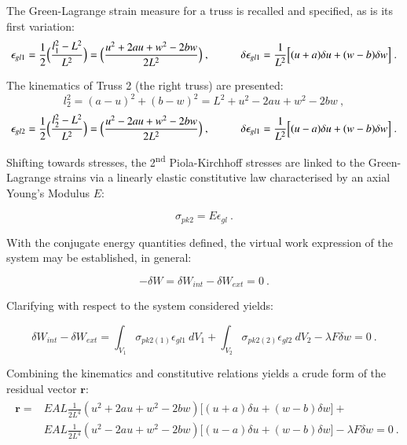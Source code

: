 The Green-Lagrange strain measure for a truss is recalled and specified, as is its first variation:
\begin{equation} 
\epsilon_{gl1} = \frac{1}{2}
\Big(\frac{l_1^2-L^2}{L^2}\Big)
=
\Big(\frac{u^2 + 2au +w^2 -2bw}{2L^2}\Big)\ ,
\hspace{10mm}
\delta\epsilon_{gl1} = 
\frac{1}{L^2}
\Big[
(u+a)\delta u
+
(w-b)\delta w
\Big]
\label{eqapp0_2}\ .
\end{equation}

The kinematics of Truss 2 (the right truss) are presented:
\begin{equation} 
l_2^2 = (a-u)^2 + (b-w)^2 = L^2 + u^2 - 2au +w^2 -2bw
\label{eqapp0_2_1}\ ,
\end{equation}
\begin{equation} 
\epsilon_{gl2} = \frac{1}{2}
\Big(\frac{l_2^2-L^2}{L^2}\Big)
=
\Big(\frac{u^2 - 2au +w^2 -2bw}{2L^2}\Big)\ ,
\hspace{10mm}
\delta\epsilon_{gl1} = 
\frac{1}{L^2}
\Big[
(u-a)\delta u
+
(w-b)\delta w
\Big]
\label{eqapp0_2_2}\ .
\end{equation}

Shifting towards stresses, the 2\textsuperscript{nd} Piola-Kirchhoff stresses are linked to the Green-Lagrange strains via a linearly elastic constitutive law characterised by an axial Young's Modulus $E$:

\begin{equation} 
\sigma_{pk2} = E \epsilon_{gl}
\label{eqapp0_3}\ .
\end{equation}

With the conjugate energy quantities defined, the virtual work expression of the system may be established, in general:

\begin{equation} 
-\delta W = \delta W_{int} - \delta W_{ext} = 0
\label{eqapp0_4}\ .
\end{equation}

Clarifying with respect to the system considered yields:

\begin{equation} 
\delta W_{int} - \delta W_{ext} = 
\int_{V_1} \sigma_{pk2(1)} \epsilon_{gl1}
\ dV_1
+
\int_{V_2} \sigma_{pk2(2)} \epsilon_{gl2}
\ dV_2
- \lambda F \delta w = 0
\label{eqapp0_5}\ .
\end{equation}

Combining the kinematics and constitutive relations yields a crude form of the residual vector $\mathbf{r}$:
\begin{gather} 
	\begin{aligned}
		\mathbf{r} = 
		&EAL
		\frac{1}{2L^4}
		(u^2 + 2au +w^2 -2bw)
		\Big[
		(u+a)\delta u
		+
		(w-b)\delta w
		\Big] +
		\\
		&EAL
		\frac{1}{2L^4}
		(u^2 - 2au +w^2 -2bw)
		\Big[
		(u-a)\delta u
		+
		(w-b)\delta w
		\Big] 
		- \lambda F \delta w = 0
		\label{eqapp0_6_0}\ .
	\end{aligned}
\end{gather}

